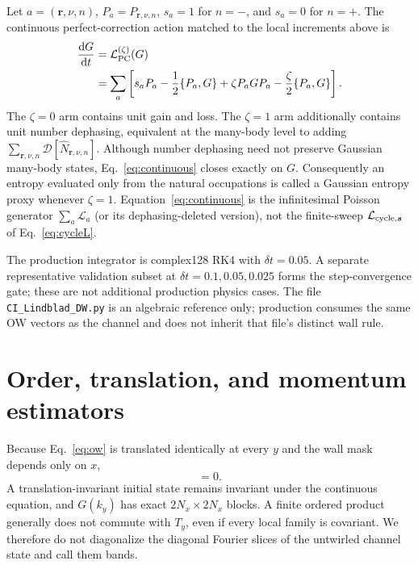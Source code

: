 \documentclass[aps,prb,twocolumn,nofootinbib,superscriptaddress,floatfix]{revtex4-2}
\newcommand{\Diss}{\mathcal D}
\begin{document}
Let $a=(\boldsymbol r,\nu,n)$, $P_a=P_{\boldsymbol r,\nu,n}$,
$s_a=1$ for $n=-$, and $s_a=0$ for $n=+$.  The continuous perfect-correction
action matched to the local increments above is
\begin{align}
 \frac{\mathrm dG}{\mathrm dt}
 &=\mathcal L_{\rm PC}^{(\zeta)}(G)\nonumber\\
 &=\sum_a\left[s_aP_a-\frac12\{P_a,G\}
 +\zeta P_aGP_a-\frac{\zeta}{2}\{P_a,G\}\right].
 \label{eq:continuous}
\end{align}
The $\zeta=0$ arm contains unit gain and loss.  The $\zeta=1$ arm additionally contains
unit number dephasing, equivalent at the many-body level to adding
$\sum_{\boldsymbol r,\nu,n}\Diss[\hat N_{\boldsymbol r,\nu,n}]$.  Although number
dephasing need not preserve Gaussian many-body states, Eq.~\eqref{eq:continuous} closes
exactly on $G$.  Consequently an entropy evaluated only from the natural occupations is
called a Gaussian entropy proxy whenever $\zeta=1$.
Equation~\eqref{eq:continuous} is the infinitesimal Poisson generator
$\sum_a\mathcal L_a$ (or its dephasing-deleted version), not the finite-sweep
$\mathcal L_{{\rm cycle},\boldsymbol s}$ of Eq.~\eqref{eq:cycleL}.

The production integrator is complex128 RK4 with $\delta t=0.05$.  A separate
representative validation subset at $\delta t=0.1,0.05,0.025$ forms the
step-convergence gate; these are not additional production physics cases.  The file
\texttt{CI\_Lindblad\_DW.py} is an algebraic reference only; production consumes the
same OW vectors as the channel and does not inherit that file's distinct wall rule.

\section{Order, translation, and momentum estimators}

Because Eq.~\eqref{eq:ow} is translated identically at every $y$ and the wall mask
depends only on $x$,
\begin{equation}
 [T_y,\mathcal L_{\rm PC}^{(\zeta)}]=0.
\end{equation}
A translation-invariant initial state remains invariant under the continuous equation,
and $G(k_y)$ has exact $2N_x\times2N_x$ blocks.  A finite ordered product generally
does not commute with $T_y$, even if every local family is covariant.  We therefore do
not diagonalize the diagonal Fourier slices of the untwirled channel state and call
them bands.
\end{document}
